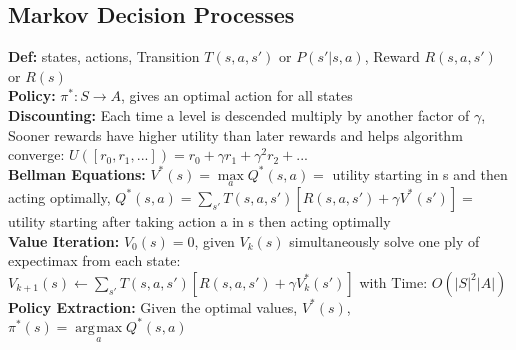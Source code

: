 \documentclass[11pt, a4paper]{article}
\DeclareMathOperator*{\argmax}{\arg\!\max}
\begin{document}
\begin{multicols*}{1}
        \section*{Markov Decision Processes}
            \textbf{Def:} states, actions, Transition $T(s, a, s')$ or $P(s' | s, a)$, Reward $R(s, a, s')$ or $R(s)$\\
            \textbf{Policy:} $\pi^{*}: S \to A$, gives an optimal action for all states\\
            \textbf{Discounting:} Each time a level is descended multiply by another factor of $\gamma$, Sooner rewards have higher utility than later rewards and helps algorithm converge: $U([r_0, r_1, ...]) = r_0 + \gamma r_1 + \gamma^2r_2 + ...$\\
            \textbf{Bellman Equations:} $V^*(s) = \max\limits_{a} Q^*(s, a) = $ utility starting in s and then acting optimally, $Q^*(s, a) = \sum\limits_{s'} T(s, a, s') [R(s, a, s') + \gamma V^*(s')] = $ utility starting after taking action a in s then acting optimally\\
            \textbf{Value Iteration:} $V_0(s) = 0$, given $V_k(s)$ simultaneously solve one ply of expectimax from each state: $V_{k + 1}(s) \gets \sum\limits_{s'} T(s, a, s') [R(s, a, s') + \gamma V_k^*(s')]$ with Time: $O(|S|^2|A|)$\\
            \textbf{Policy Extraction:} Given the optimal values, $V^*(s)$, $\pi^*(s) = \argmax\limits_{a} Q^*(s, a)$\\

    \end{multicols*}
\end{document}
